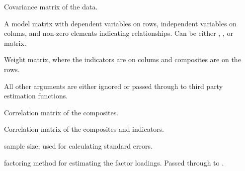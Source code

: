 \documentclass[a4paper]{book}
\begin{document}
\begin{Arguments}
\begin{ldescription}
\item[\code{S}] Covariance matrix of the data.

\item[\code{modelMatrix}] A model matrix with dependent variables on rows, independent variables on colums, and
non-zero elements indicating relationships. Can be either , ,
or  matrix.

\item[\code{W}] Weight matrix, where the indicators are on colums and composites are on the rows.

\item[\code{...}] All other arguments are either ignored or passed through to third party estimation functions.

\item[\code{C}] Correlation matrix of the composites.

\item[\code{IC}] Correlation matrix of the composites and indicators.

\item[\code{n}] sample size, used for calculating standard errors.

\item[\code{fm}] factoring method for estimating the factor loadings. Passed through to .
\end{ldescription}
\end{Arguments}
%
\end{document}
